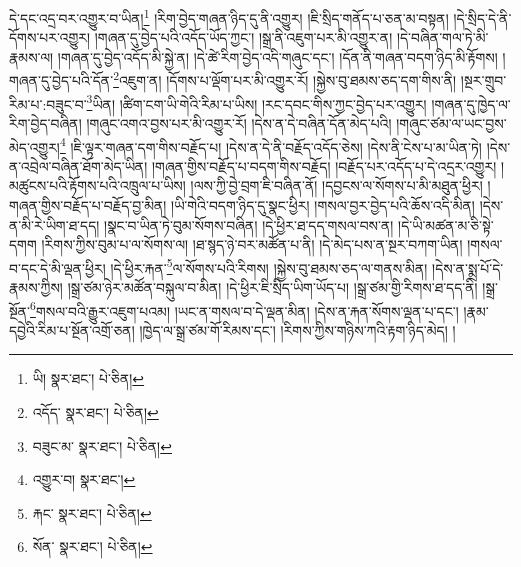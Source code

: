 དེ་དང་འདྲ་བར་འགྱུར་བ་ཡིན།\footnote{ཡི།  སྣར་ཐང་།  པེ་ཅིན། } །རིག་བྱེད་གཞན་ཉིད་དུ་ནི་འགྱུར། །ཇི་སྲིད་གནོད་པ་ཅན་མ་བསྟན། །དེ་སྲིད་དེ་ནི་དོགས་པར་འགྱུར། །གཞན་དུ་བྱེད་པའི་འདོད་ཡོད་ཀྱང་། །སྒྲ་ནི་འཇུག་པར་མི་འགྱུར་ན། །དེ་བཞིན་གལ་ཏེ་མི་རྣམས་ལ། །གཞན་དུ་བྱེད་འདོད་མི་སྐྱེ་ན། །དེ་ཚེ་རིག་བྱེད་འདི་གཞུང་དང་། །དོན་ནི་གཞན་བདག་ཉིད་མི་རྟོགས། །གཞན་དུ་བྱེད་པའི་དོན་\footnote{འདོད་  སྣར་ཐང་།  པེ་ཅིན། }འཇུག་ན། །དོགས་པ་ལྡོག་པར་མི་འགྱུར་རོ། །སྐྱེས་བུ་ཐམས་ཅད་དག་གིས་ནི། །སྔར་གྲུབ་རིམ་པ་:བཟུང་བ་\footnote{བཟུང་མ་  སྣར་ཐང་།  པེ་ཅིན། }ཡིན། །ཚིག་ངག་ཡི་གེའི་རིམ་པ་ཡིས། །རང་དབང་གིས་ཀྱང་བྱེད་པར་འགྱུར། །གཞན་དུ་ཁྱེད་ལ་རིག་བྱེད་བཞིན། །གཞུང་འགའ་བྱས་པར་མི་འགྱུར་རོ། །དེས་ན་དེ་བཞིན་དོན་མེད་པའི། །གཞུང་ཙམ་ལ་ཡང་བྱས་མེད་འགྱུར།\footnote{འགྱུར་བ།  སྣར་ཐང་། } །ཇི་ལྟར་གཞན་དག་གིས་བརྗོད་པ། །དེས་ན་དེ་ནི་བརྗོད་འདོད་ཅེས། །དེས་ནི་ངེས་པ་མ་ཡིན་ཏེ། །དེས་ན་འབྲེལ་བཞིན་ཐོག་མེད་ཡིན། །གཞན་གྱིས་བརྗོད་པ་བདག་གིས་བརྗོད། །བརྗོད་པར་འདོད་པ་དེ་འདྲར་འགྱུར། །མཚུངས་པའི་རྟོགས་པའི་འཁྲུལ་པ་ཡིས། །ལས་ཀྱི་བྱེ་བྲག་ཇི་བཞིན་ནོ། །དབྱངས་ལ་སོགས་པ་མི་མཐུན་ཕྱིར། །གཞན་གྱིས་བརྗོད་པ་བརྗོད་བྱ་མིན། །ཡི་གེའི་བདག་ཉིད་དུ་སྣང་ཕྱིར། །གསལ་བྱར་བྱེད་པའི་ཆོས་འདི་མིན། །དེས་ན་མི་རེ་ཡིག་ཐ་དད། །སྣང་བ་ཡིན་ཏེ་བུམ་སོགས་བཞིན། །དེ་ཕྱིར་ཐ་དད་གསལ་བས་ན། །དེ་ཡི་མཚན་མ་ཅི་སྟེ་དགག །རིགས་ཀྱིས་བུམ་པ་ལ་སོགས་ལ། །ཐ་སྙད་ཉེ་བར་མཚོན་པ་ནི། །དེ་མེད་པས་ན་སྔར་བཀག་ཡིན། །གསལ་བ་དང་དེ་མི་ལྡན་ཕྱིར། །དེ་ཕྱིར་རྐན་\footnote{རྐང་  སྣར་ཐང་།  པེ་ཅིན། }ལ་སོགས་པའི་རིགས། །སྐྱེས་བུ་ཐམས་ཅད་ལ་གནས་མིན། །དེས་ན་སྨྲ་པོ་དེ་རྣམས་ཀྱིས། །སྒྲ་ཙམ་ཉེར་མཚོན་བསྐུལ་བ་མིན། །དེ་ཕྱིར་ཇི་སྲིད་ཡིག་ཡོད་པ། །སྒྲ་ཙམ་གྱི་རིགས་ཐ་དད་ནི། །སྒྲ་སྔོན་\footnote{སོན་  སྣར་ཐང་།  པེ་ཅིན། }གསལ་བའི་རྒྱུར་འཇུག་པའམ། །ཡང་ན་གསལ་བ་དེ་ལྡན་མིན། །དེས་ན་རྐན་སོགས་ལྡན་པ་དང་། །རྣམ་དབྱེའི་རིམ་པ་སྔོན་འགྲོ་ཅན། །ཁྱེད་ལ་སྒྲ་ཙམ་གོ་རིམས་དང་། །རིགས་ཀྱིས་གཉིས་ཀའི་རྟག་ཉིད་མེད། །

